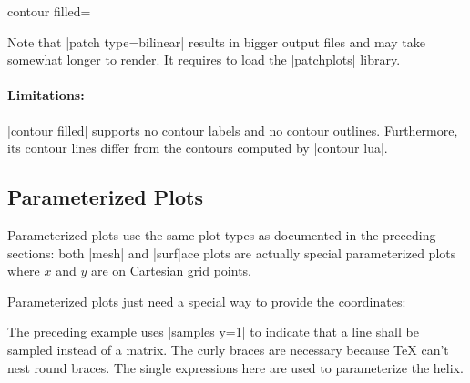 {{\begin{plottype}[/pgfplots]{
    contour filled=\textcolor{black}{}%
}
\begin{codeexample}[]
\end{codeexample}
    \noindent Note that |patch type=bilinear| results in bigger output files
    and may take somewhat longer to render. It requires to load the
    |patchplots| library.


    \paragraph{Limitations:}

    |contour filled| supports no contour labels and no contour outlines.
    Furthermore, its contour lines differ from the contours computed by
    |contour lua|.
\end{plottype}
}


\subsection{Parameterized Plots}

{

Parameterized plots use the same plot types as documented in the preceding
sections: both |mesh| and |surf|ace plots are actually special parameterized
plots where $x$ and $y$ are on Cartesian grid points.

Parameterized plots just need a special way to provide the coordinates:

\pgfplotsexpensiveexample
\begin{codeexample}[]
\end{codeexample}

\noindent The preceding example uses |samples y=1| to indicate that a line
shall be sampled instead of a matrix. The curly braces are necessary because
\TeX{} can't nest round braces. The single expressions here are used to
parameterize the helix.

}}

